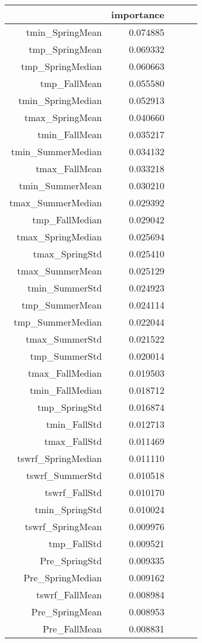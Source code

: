 \begin{tabular}{rrrrr}
\toprule
 & importance \\
\midrule
tmin_SpringMean & 0.074885 \\
tmp_SpringMean & 0.069332 \\
tmp_SpringMedian & 0.060663 \\
tmp_FallMean & 0.055580 \\
tmin_SpringMedian & 0.052913 \\
tmax_SpringMean & 0.040660 \\
tmin_FallMean & 0.035217 \\
tmin_SummerMedian & 0.034132 \\
tmax_FallMean & 0.033218 \\
tmin_SummerMean & 0.030210 \\
tmax_SummerMedian & 0.029392 \\
tmp_FallMedian & 0.029042 \\
tmax_SpringMedian & 0.025694 \\
tmax_SpringStd & 0.025410 \\
tmax_SummerMean & 0.025129 \\
tmin_SummerStd & 0.024923 \\
tmp_SummerMean & 0.024114 \\
tmp_SummerMedian & 0.022044 \\
tmax_SummerStd & 0.021522 \\
tmp_SummerStd & 0.020014 \\
tmax_FallMedian & 0.019503 \\
tmin_FallMedian & 0.018712 \\
tmp_SpringStd & 0.016874 \\
tmin_FallStd & 0.012713 \\
tmax_FallStd & 0.011469 \\
tswrf_SpringMedian & 0.011110 \\
tswrf_SummerStd & 0.010518 \\
tswrf_FallStd & 0.010170 \\
tmin_SpringStd & 0.010024 \\
tswrf_SpringMean & 0.009976 \\
tmp_FallStd & 0.009521 \\
Pre_SpringStd & 0.009335 \\
Pre_SpringMedian & 0.009162 \\
tswrf_FallMean & 0.008984 \\
Pre_SpringMean & 0.008953 \\
Pre_FallMean & 0.008831 \\

\end{tabular}

